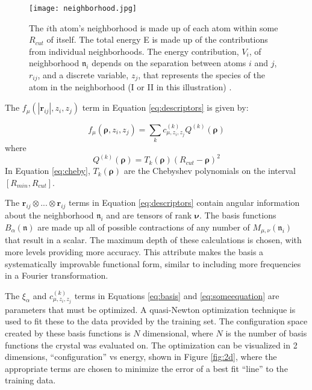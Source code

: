 \documentclass{article}
\begin{document}
\begin{figure}[h]
  \centering
  \texttt{[image: neighborhood.jpg]}
  \caption{The $i$th atom's neighborhood is made up of each atom
    within some $R_{cut}$ of itself. The total energy E is made up of
    the contributions from individual neighborhoods. The energy
    contribution, $V_i$, of neighborhood $\mathfrak{n}_i$ depends on
    the separation between atoms $i$ and $j$, $r_{ij}$, and a discrete
    variable, $z_j$, that represents the species of the atom in the
    neighborhood (I or II in this illustration)
    \cite{gubaev2019accelerating}. }
  \label{fig:neighborhood}
\end{figure}

The $f_{\mu}\left( \left| \mathbf{r}_{ij} \right| ,z_i,z_j
\right)$ term in Equation \ref{eq:descriptors} is given by:

\begin{equation} \label{eq:someequation}
  f_{\mu} \left( \mathbf{\rho} ,z_i,z_j \right) =
  \sum\limits_{k}c_{\mu,z_i,z_j}^{\left( k \right)}Q^{\left( k \right)} \left(
    \mathbf{\rho}
  \right)
\end{equation}
where
\begin{equation}  \label{eq:cheby}
  Q^{\left(k\right)} \left( \mathbf{\rho} \right) =
  T_k\left( \mathbf{\rho} \right)\left( R_{cut} - \mathbf{\rho}
  \right)^2
\end{equation}
In Equation \ref{eq:cheby}, $T_k\left(  \mathbf{\rho} \right)$ are the
Chebyshev polynomials on the interval $\left[ R_{min},R_{cut}\right]$.

The $\mathbf{r}_{ij}\otimes...\otimes\mathbf{r}_{ij}$ terms in
Equation \ref{eq:descriptors} contain angular information about the
neighborhood $\mathfrak{n}_i$ and are tensors of rank $\mathbf{\nu}$.
The basis functions $B_{\alpha} \left(\mathfrak{n} \right) $ are made
up all of possible contractions of any number of
$M_{\mu,\nu}\left(\mathfrak{n}_i\right)$ that result in a scalar. The
maximum depth of these calculations is chosen, with more levels
providing more accuracy. This attribute makes the basis a
systematically improvable functional form, similar to including more
frequencies in a Fourier transformation.

The $\xi_{\alpha}$ and $c_{\mu,z_i,z_j}^{\left( k \right)}$ terms in
Equations \ref{eq:basis} and \ref{eq:someequation} are parameters that must
be optimized. A quasi-Newton optimization technique is used to fit
these to the data provided by the training set.  The configuration
space created by these basis functions is $N$ dimensional, where $N$
is the number of basis functions the crystal was evaluated on. The
optimization can be visualized in 2 dimensions, ``configuration'' vs
energy, shown in Figure \ref{fig:2d}, where the appropriate terms are
chosen to minimize the error of a best fit ``line'' to the training
data.
\end{document}
